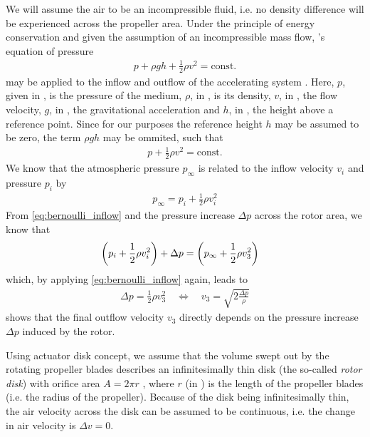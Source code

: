 We will assume the air to be an incompressible fluid, i.e. no density difference will be experienced across the propeller area. 
Under the principle of energy conservation and given the assumption of an incompressible mass flow, 's equation of pressure
%
\begin{align}
p + \rho g h + \frac{1}{2}\rho v^2 = \text{const.}
\end{align}
%
may be applied to the inflow and outflow of the accelerating system \cite{seddon2002}.
Here, $p$, given in \withunit{\newton\per\square\metre}, is the pressure of the medium, 
$\rho$, in \withunit{\kilo\gram\per\cubic\metre}, is its density,
$v$, in \withunit{\metre\per\second}, the flow velocity,
$g$, in , the gravitational acceleration and
$h$, in \withunit{\metre}, the height above a reference point.
Since for our purposes the reference height $h$ may be assumed to be zero, the term $\rho g h$ may be ommited, such that
%
\begin{align}
p + \frac{1}{2}\rho v^2 = \text{const.} \label{eq:bernoulli}
\end{align}
%
We know that the atmospheric pressure $p_\infty$ is related to the inflow velocity $v_i$ and pressure $p_i$ by
%
\begin{align}
p_\infty = p_i + \frac{1}{2}\rho v_i^2 \label{eq:bernoulli_inflow}
\end{align}
%
From \cref{eq:bernoulli_inflow} and the pressure increase $\Delta p$ across the
rotor area, we know that 
%
\begin{align}
 \left(p_i + \frac{1}{2}\rho v_i^2 \right) + \Delta p &= \left( p_\infty + \frac{1}{2}\rho v_3^2 \right) \label{eq:bernoulli_outflow}
\end{align}
%
which, by applying \cref{eq:bernoulli_inflow} again, leads to
%
\begin{align}
 \Delta p = \frac{1}{2}\rho v_3^2 
 \quad \Leftrightarrow \quad 
 v_3 = \sqrt{2\frac{\Delta p}{\rho}} \label{eq:deltap_vinfty} 
\end{align}
%
 shows that the final outflow velocity $v_3$ directly depends on the pressure increase $\Delta p$ induced by the rotor.

Using actuator disk concept, we assume that the volume swept out by the rotating propeller blades describes an infinitesimally thin disk (the so-called \textit{rotor disk}) with orifice area $A = 2\pi r$%
, where $r$ (in \withunit{\metre}) is the length of the propeller blades (i.e. the radius of the propeller).
Because of the disk being infinitesimally thin, the air velocity across the disk can be assumed to be continuous, i.e. the change in air velocity is $\Delta v = 0$. 

